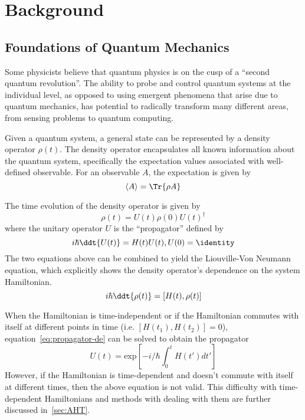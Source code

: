 \chapter{Background}

\section{Foundations of Quantum Mechanics}



Some physicists believe that quantum physics is on the cusp of a ``second quantum revolution''\cite{quantum-rev}. The ability to probe and control quantum systems at the individual level, as opposed to using emergent phenomena that arise due to quantum mechanics, has potential to radically transform many different areas, from sensing problems to quantum computing.

Given a quantum system, a general state can be represented by a density operator $\rho(t)$. The density operator encapsulates all known information about the quantum system, specifically the expectation values associated with well-defined observable. For an observable $A$, the expectation is given by
\[
\langle A \rangle = \Tr{\rho A}
\]

The time evolution of the density operator is given by
\begin{equation}\label{eq:density-time}
    \rho(t) = U(t) \rho(0) U(t)^\dagger
\end{equation}
where the unitary operator $U$ is the ``propagator'' defined by
\begin{equation}\label{eq:propagator-de}
    i\hbar \ddt{U(t)} = H(t) U(t), U(0) = \identity
\end{equation}
The two equations above can be combined to yield the Liouville-Von Neumann equation, which explicitly shows the density operator's dependence on the system Hamiltonian.
\begin{equation}
    i\hbar \ddt{\rho(t)} = [H(t), \rho(t)]
\end{equation}

When the Hamiltonian is time-independent or if the Hamiltonian commutes with itself at different points in time (i.e. $[H(t_1), H(t_2)] = 0$), equation~\ref{eq:propagator-de} can be solved to obtain the propagator
\[
U(t) = \text{exp}\left[ {-i/\hbar \int_0^t H(t') dt'} \right]
\]
However, if the Hamiltonian is time-dependent and doesn't commute with itself at different times, then the above equation is not valid. This difficulty with time-dependent Hamiltonians and methods with dealing with them are further discussed in~\ref{sec:AHT}.

